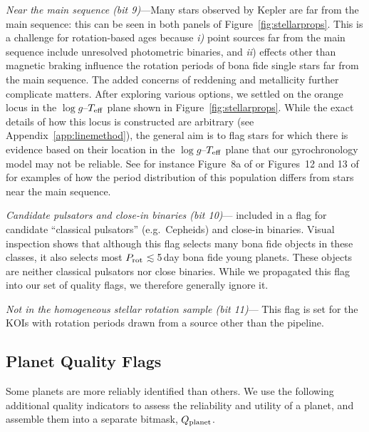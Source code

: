 \documentclass[11pt,twocolumn,tighten]{aastex63}
\begin{document}
{\it Near the main sequence (bit 9)}---Many stars observed by Kepler
are far from the main sequence: this can be seen in both panels of
Figure~\ref{fig:stellarprops}.  This is a challenge for rotation-based
ages because {\it i)} point sources far from the main sequence include
unresolved photometric binaries, and {\it ii}) effects other than
magnetic braking influence the rotation periods of bona fide single
stars far from the main sequence.  The added concerns of
reddening and metallicity further complicate matters.  After exploring
various options, we settled on the orange locus in the $\log
g$--$T_{\rm eff}$ plane shown in Figure~\ref{fig:stellarprops}.  While
the exact details of how this locus is constructed are arbitrary (see Appendix~\ref{app:linemethod}),
the general aim is to flag stars for which there is evidence based on
their location in the $\log g$--$T_{\rm eff}$ plane that our
gyrochronology model may not be reliable.  
See for instance Figure~8a of \citet{2022AJ....164..137K} or
Figures~12 and 13 of \citet{2023ApJS..268....4F} for examples of how
the period distribution of this population differs from stars near the
main sequence.


{\it Candidate pulsators and close-in binaries (bit
10)}---\citeauthor{Santos_2021} included in a flag for candidate
``classical pulsators'' (e.g.\ Cepheids) and close-in binaries.
Visual inspection shows that although this flag selects many bona fide
objects in these classes, it also selects most $P_{\rm
rot}$$\lesssim$5\,day bona fide young planets.  These objects are
neither classical pulsators nor close binaries.  While we propagated
this flag into our set of quality flags, we therefore generally ignore
it.

{\it Not in the homogeneous stellar rotation sample (bit 11)}--- This
flag is set for the KOIs with rotation periods drawn from a source
other than the \citeauthor{Santos_2019} pipeline.




\subsection{Planet Quality Flags}
\label{subsec:plflags}
Some planets are more reliably identified than others.  We use the
following additional quality indicators to assess the reliability and
utility of a planet, and assemble them into a separate bitmask,
$Q_{\rm planet}$.
\end{document}
